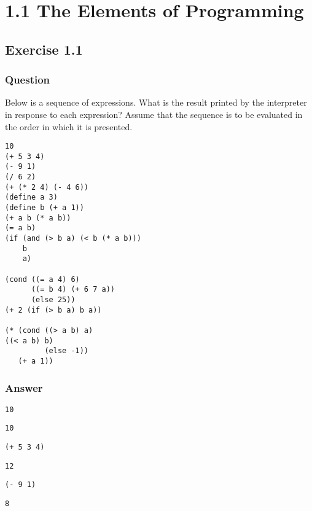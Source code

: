 \documentclass[11pt]{article}
\author{alfie}
\date{\today}
\title{}
\begin{document}
\tableofcontents

\setcounter{secnumdepth}{0}

\section{1.1 The Elements of Programming}
\label{sec:org790a04a}
\subsection{Exercise 1.1}
\label{sec:org6f54a59}
\subsubsection{Question}
\label{sec:org759c482}
Below is a sequence of expressions. What is
the result printed by the interpreter in response to each
expression? Assume that the sequence is to be evaluated in
the order in which it is presented.
\begin{verbatim}
10
(+ 5 3 4)
(- 9 1)
(/ 6 2)
(+ (* 2 4) (- 4 6))
(define a 3)
(define b (+ a 1))
(+ a b (* a b))
(= a b)
(if (and (> b a) (< b (* a b)))
    b
    a)

(cond ((= a 4) 6)
      ((= b 4) (+ 6 7 a))
      (else 25))
(+ 2 (if (> b a) b a))

(* (cond ((> a b) a)
((< a b) b)
         (else -1))
   (+ a 1))
\end{verbatim}

\subsubsection{Answer}
\label{sec:org0bf7fb2}
\begin{verbatim}
10
\end{verbatim}

\begin{verbatim}
10
\end{verbatim}


\begin{verbatim}
(+ 5 3 4)
\end{verbatim}

\begin{verbatim}
12
\end{verbatim}


\begin{verbatim}
(- 9 1)
\end{verbatim}

\begin{verbatim}
8
\end{verbatim}
\end{document}
